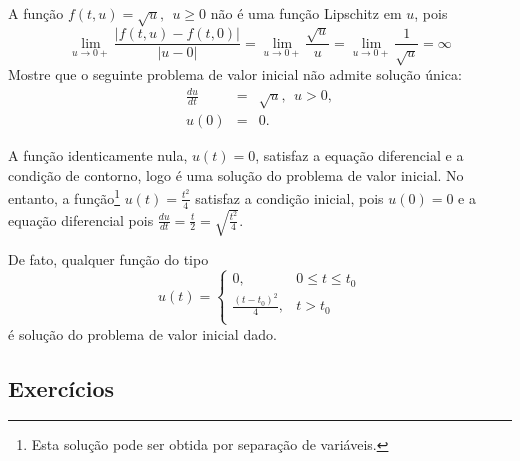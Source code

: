 \begin{exeresol} A função $f(t,u)=\sqrt{u},~~u\geq 0$ não é uma função Lipschitz em $u$, pois
$$\lim_{u\to 0+} \frac{|f(t,u)-f(t,0)|}{|u-0|}=\lim_{u\to 0+} \frac{\sqrt{u}}{u}=\lim_{u\to 0+} \frac{1}{\sqrt{u}}=\infty$$
 Mostre que o seguinte problema de valor inicial não admite solução única:
\begin{eqnarray}
   \frac{du}{dt} &=&\sqrt{u},~~u>0,\\
            u(0) &=& 0.
\end{eqnarray}
\end{exeresol}
\begin{resol}
 A função identicamente nula, $u(t)=0$, satisfaz a equação diferencial e a condição de contorno, logo é uma solução do problema de valor inicial. No entanto, a função\footnote{Esta solução pode ser obtida por separação de variáveis.} $u(t)=\frac{t^2}{4}$ satisfaz a condição inicial, pois $u(0)=0$ e a equação diferencial pois $\frac{du}{dt}=\frac{t}{2}=\sqrt{\frac{t^2}{4}}$.
 
 De fato, qualquer função do tipo
 $$u(t)=\left\{
 \begin{array}{ll}
  0,&0\leq t \leq t_0\\
  \frac{(t-t_0)^2}{4},& t >t_0\\
 \end{array}
 \right.$$
 é solução do problema de valor inicial dado.
\end{resol}


\emconstrucao

\subsection*{Exercícios}

\emconstrucao

